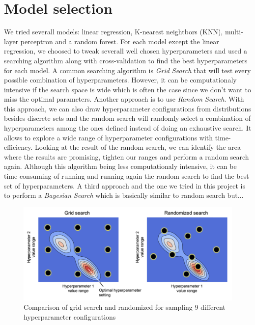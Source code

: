 \section{Model selection}

We tried severall models: linear regression, K-nearest neightbors (KNN), multi-layer perceptron and a random forest. For each model except the linear regression, we choosed to tweak severall well chosen hyperparameters and used a searching algorithm along with cross-validation to find the best hyperparameters for each model. A common searching algorithm is \textit{Grid Search} that will test every possible combination of hyperparameters. However, it can be computationaly intensive if the search space is wide which is often the case since we don't want to miss the optimal parameters. Another approach is to use \textit{Random Search}. With this approach, we can also draw hyperparameter configurations from distributions besides discrete sets and the random search will randomly select a combination of hyperparameters among the ones defined instead of doing an exhaustive search. It allows to explore a wide range of hyperparameter configurations with time-efficiency. Looking at the result of the random search, we can identify the area where the results are promising, tighten our ranges and perform a random search again. Although this algorithm being less computationaly intensive, it can be time consuming of running and running again the random search to find the best set of hyperparameters. A third approach and the one we tried in this project is to perform a \textit{Bayesian Search} which is basically similar to random search but...

\begin{figure}[H]
	\centering
	\includegraphics{figures/grid_search_vs_random_search.png}
	\caption{Comparison of grid search and randomized for sampling $9$ different hyperparameter configurations}
	\label{fig:gridsearch_vs_randomsearch}
\end{figure}